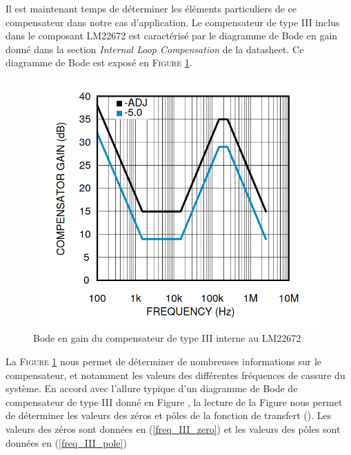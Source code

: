 				Il est maintenant temps de déterminer les éléments particuliers 
				de ce compensateur dans notre cas d'application. Le compensateur 
				de type III inclus dans le composant LM22672 est caractérisé par 
				le diagramme de Bode en gain donné dans la section 
				\textit{Internal Loop Compensation} de la datasheet. Ce diagramme 
				de Bode est exposé en \textsc{Figure \ref{comp_gain}}.
										
				\begin{figure}[h]
					\begin{center}
						\includegraphics[scale=0.4]{../Illus/comp_gain.png}
					\end{center}
					\vspace{-2em}
					\caption{Bode en gain du compensateur de type III interne au LM22672 \cite{LM22672}}
					\label{comp_gain}
				\end{figure}
					
				La \textsc{Figure \ref{comp_gain}} nous permet de déterminer de 
				nombreuses informations sur le compensateur, et notamment les 
				valeurs des différentes fréquences de cassure du système. En accord
				avec l'allure typique d'un diagramme de Bode de compensateur de 
				type III donné en Figure , la lecture de la Figure nous permet de 
				déterminer les valeurs des zéros et pôles de la fonction de 
				transfert (). Les valeurs des zéros sont données en 
				(\ref{freq_III_zero}) et les valeurs des pôles sont données en 
				(\ref{freq_III_pole})
										
